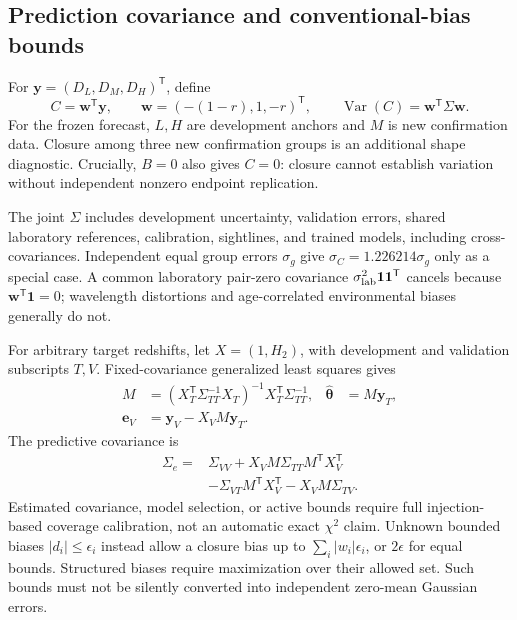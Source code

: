 \subsection{Prediction covariance and conventional-bias bounds}
\label{app:prediction_covariance}

For $\mathbf y=(D_L,D_M,D_H)^{\mathsf T}$, define
\begin{equation}
 C=\mathbf w^{\mathsf T}\mathbf y,
 \qquad\mathbf w=(-(1-r),1,-r)^{\mathsf T},
 \qquad\operatorname{Var}(C)=\mathbf w^{\mathsf T}\Sigma\mathbf w.
 \label{app:closure}
\end{equation}
For the frozen forecast, $L,H$ are development anchors and $M$ is new
confirmation data.  Closure among three new confirmation groups is an
additional shape diagnostic.  Crucially, $B=0$ also gives $C=0$: closure
cannot establish variation without independent nonzero endpoint replication.

The joint $\Sigma$ includes development uncertainty, validation errors, shared
laboratory references, calibration, sightlines, and trained models, including
cross-covariances.  Independent equal group errors $\sigma_g$ give
$\sigma_C=1.226214\sigma_g$ only as a special case.  A common laboratory
pair-zero covariance $\sigma_{\rm lab}^2\mathbf1\mathbf1^{\mathsf T}$ cancels
because $\mathbf w^{\mathsf T}\mathbf1=0$; wavelength distortions and
age-correlated environmental biases generally do not.

For arbitrary target redshifts, let $X=(1,H_2)$, with development and
validation subscripts $T,V$.  Fixed-covariance generalized least squares gives
\begin{align}
 M&=(X_T^{\mathsf T}\Sigma_{TT}^{-1}X_T)^{-1}
       X_T^{\mathsf T}\Sigma_{TT}^{-1},
 &\widehat{\boldsymbol\theta}&=M\mathbf y_T,
 \label{app:development_estimator}\\
 \mathbf e_V&=\mathbf y_V-X_VM\mathbf y_T.
 \label{app:validation_residual}
\end{align}
The predictive covariance is
\begin{equation}
 \begin{split}
 \Sigma_e={}&\Sigma_{VV}
 +X_VM\Sigma_{TT}M^{\mathsf T}X_V^{\mathsf T}\\
 &-\Sigma_{VT}M^{\mathsf T}X_V^{\mathsf T}
 -X_VM\Sigma_{TV}.
 \end{split}
 \label{app:full_prediction_covariance}
\end{equation}
Estimated covariance, model selection, or active bounds require full
injection-based coverage calibration, not an automatic exact $\chi^2$ claim.
Unknown bounded biases $|d_i|\leq\epsilon_i$ instead allow a closure bias up to
$\sum_i|w_i|\epsilon_i$, or $2\epsilon$ for equal bounds.  Structured biases
require maximization over their allowed set.  Such bounds must not be
silently converted into independent zero-mean Gaussian errors.

